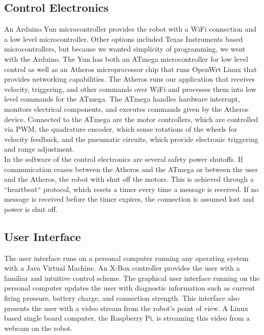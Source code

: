 \documentclass[letterpaper,12pt]{article}
\begin{document}
\subsection{Control Electronics}
An Arduino Yun microcontroller provides the robot with a WiFi
connection and a low level microcontroller. Other options included Texas
Instruments based microcontrollers, but because we wanted simplicity of
programming, we went with the Arduino. The Yun has both an ATmega
microcontroller for low level control as well as an Atheros microprocessor chip
that runs OpenWrt Linux that provides networking capabilities. The Atheros runs
our application that receives velocity, triggering, and other commands over
WiFi and processes them into low level commands for the ATmega. The ATmega
handles hardware interrupt, monitors electrical components, and executes
commands given by the Atheros device. Connected to the ATmega are the motor
controllers, which are controlled via PWM, the quadrature encoder, which sense
rotations of the wheels for velocity feedback, and the pneumatic circuits,
which provide electronic triggering and range adjustment.\\

In the software of the control electronics are several safety power shutoffs.
If communication ceases between the Atheros and the ATmega or between the user
and the Atheros, the robot with shut off the motors. This is achieved through
a “heartbeat“ protocol, which resets a timer every time a message is received.
If no message is received before the timer expires, the connection is assumed
lost and power is shut off.\\

\subsection{User Interface}
The user interface runs on a personal computer running any operating system
with a Java Virtual Machine. An X-Box controller provides the user with
a familiar and intuitive control scheme. The graphical user interface running
on the personal computer updates the user with diagnostic information such as
current firing pressure, battery charge, and connection strength. This
interface also presents the user with a video stream from the robot’s point of
view. A Linux based single board computer, the Raspberry Pi, is streaming this
video from a webcam on the robot.\\
\end{document}

